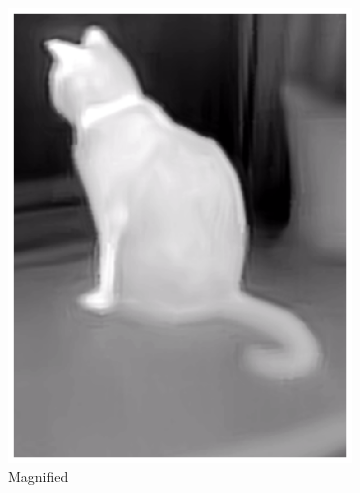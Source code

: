 \documentclass{l4proj}
\begin{document}
\begin{figure}[ht]
\begin{subfigure}[h!]{0.24\textwidth}
    \includegraphics[width=\textwidth]{images/augmentation/zoomed.png}
    \caption{Magnified}
  \end{subfigure}
  \begin{subfigure}[h!]{0.24\textwidth}

\end{subfigure}
\end{figure}
\end{document}
